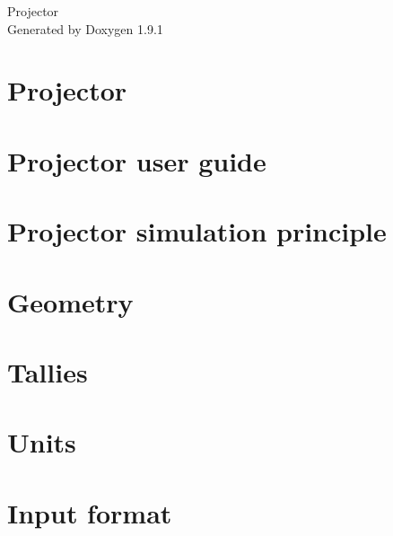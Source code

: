 \let\mypdfximage\pdfximage\def\pdfximage{\immediate\mypdfximage}\documentclass[twoside]{book}
\newcommand{\+}{\discretionary{\mbox{\scriptsize$\hookleftarrow$}}{}{}}
\newcommand{\clearemptydoublepage}{%
  \newpage{\pagestyle{empty}\cleardoublepage}%
}
\begin{document}
\raggedbottom

\hypersetup{pageanchor=false,
             bookmarksnumbered=true,
             pdfencoding=unicode
            }
\begin{titlepage}
\vspace*{7cm}
\begin{center}%
{\Large Projector }\\
\vspace*{1cm}
{\large Generated by Doxygen 1.9.1}\\
\end{center}
\end{titlepage}
\clearemptydoublepage
{}
\tableofcontents
\clearemptydoublepage
{}
\hypersetup{pageanchor=true}

\chapter{Projector}
\label{index}\hypertarget{index}{}
\chapter{Projector user guide}
\label{md_docs_00_user_guide}

\chapter{Projector simulation principle}
\label{md_docs_01_simulation_principle}

\chapter{Geometry}
\label{md_docs_02_geometry}

\chapter{Tallies}
\label{md_docs_03_tallies}

\chapter{Units}
\label{md_docs_05_units}

\chapter{Input format}
\label{md_docs_06_input_format}

\end{document}
